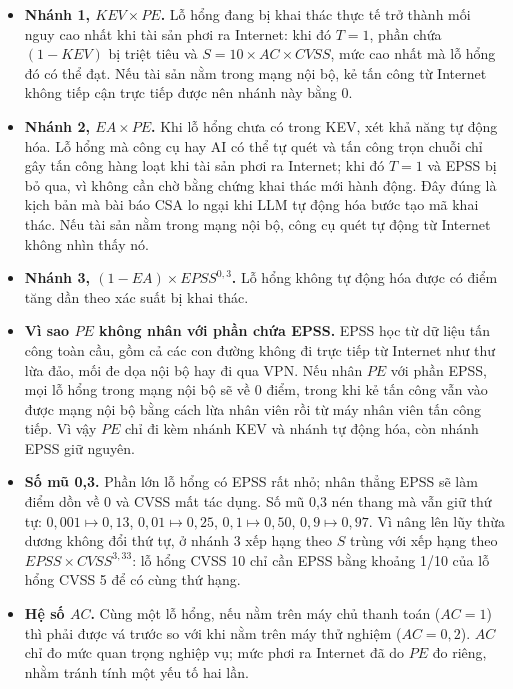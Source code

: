 \documentclass[runningheads]{llncs}
\begin{document}
\begin{itemize}
\item \textbf{Nhánh 1, $\mathit{KEV} \times \mathit{PE}$.} Lỗ hổng đang bị khai thác thực tế trở thành
mối nguy cao nhất khi tài sản phơi ra Internet: khi đó $T = 1$, phần chứa $(1-\mathit{KEV})$ bị triệt
tiêu và $S = 10 \times AC \times \mathit{CVSS}$, mức cao nhất mà lỗ hổng đó có thể đạt. Nếu tài sản nằm
trong mạng nội bộ, kẻ tấn công từ Internet không tiếp cận trực tiếp được nên nhánh này bằng 0.
\item \textbf{Nhánh 2, $\mathit{EA} \times \mathit{PE}$.} Khi lỗ hổng chưa có trong KEV, xét khả năng tự
động hóa. Lỗ hổng mà công cụ hay AI có thể tự quét và tấn công trọn chuỗi chỉ gây tấn công hàng loạt khi
tài sản phơi ra Internet; khi đó $T = 1$ và EPSS bị bỏ qua, vì không cần chờ bằng chứng khai thác mới
hành động. Đây đúng là kịch bản mà bài báo CSA lo ngại khi LLM tự động hóa bước tạo mã khai thác. Nếu
tài sản nằm trong mạng nội bộ, công cụ quét tự động từ Internet không nhìn thấy nó.
\item \textbf{Nhánh 3, $(1-\mathit{EA}) \times \mathit{EPSS}^{0{,}3}$.} Lỗ hổng không tự động hóa được
có điểm tăng dần theo xác suất bị khai thác.
\item \textbf{Vì sao $\mathit{PE}$ không nhân với phần chứa EPSS.} EPSS học từ dữ liệu tấn công toàn cầu,
gồm cả các con đường không đi trực tiếp từ Internet như thư lừa đảo, mối đe dọa nội bộ hay đi qua VPN.
Nếu nhân $\mathit{PE}$ với phần EPSS, mọi lỗ hổng trong mạng nội bộ sẽ về 0 điểm, trong khi kẻ tấn công
vẫn vào được mạng nội bộ bằng cách lừa nhân viên rồi từ máy nhân viên tấn công tiếp. Vì vậy $\mathit{PE}$
chỉ đi kèm nhánh KEV và nhánh tự động hóa, còn nhánh EPSS giữ nguyên.
\item \textbf{Số mũ 0,3.} Phần lớn lỗ hổng có EPSS rất nhỏ; nhân thẳng EPSS sẽ làm điểm dồn về 0 và CVSS
mất tác dụng. Số mũ 0,3 nén thang mà vẫn giữ thứ tự: $0{,}001 \mapsto 0{,}13$, $0{,}01 \mapsto 0{,}25$,
$0{,}1 \mapsto 0{,}50$, $0{,}9 \mapsto 0{,}97$. Vì nâng lên lũy thừa dương không đổi thứ tự, ở nhánh 3
xếp hạng theo $S$ trùng với xếp hạng theo $\mathit{EPSS} \times \mathit{CVSS}^{3{,}33}$: lỗ hổng CVSS 10
chỉ cần EPSS bằng khoảng 1/10 của lỗ hổng CVSS 5 để có cùng thứ hạng.
\item \textbf{Hệ số $AC$.} Cùng một lỗ hổng, nếu nằm trên máy chủ thanh toán ($AC = 1$) thì phải được vá trước so với khi nằm
trên máy thử nghiệm ($AC = 0{,}2$). $AC$ chỉ đo mức quan trọng nghiệp vụ; mức phơi ra Internet đã do
$\mathit{PE}$ đo riêng, nhằm tránh tính một yếu tố hai lần.
\end{itemize}
\end{document}
